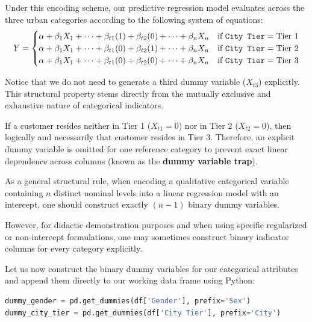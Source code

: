 Under this encoding scheme, our predictive regression model evaluates across the three urban categories according to the following system of equations:
\begin{align}
	Y =
	\begin{cases}
		\alpha + \beta_{1}X_{1} + \dots + \beta_{t1}(1) + \beta_{t2}(0) + \dots + \beta_{n}X_{n} & \text{if } \texttt{City Tier} = \text{Tier 1} \\
		\alpha + \beta_{1}X_{1} + \dots + \beta_{t1}(0) + \beta_{t2}(1) + \dots + \beta_{n}X_{n} & \text{if } \texttt{City Tier} = \text{Tier 2} \\
		\alpha + \beta_{1}X_{1} + \dots + \beta_{t1}(0) + \beta_{t2}(0) + \dots + \beta_{n}X_{n} & \text{if } \texttt{City Tier} = \text{Tier 3}
	\end{cases}
\end{align}

Notice that we do not need to generate a third dummy variable ($X_{t3}$) explicitly. This structural property stems directly from the mutually exclusive and exhaustive nature of categorical indicators.

If a customer resides neither in Tier 1 ($X_{t1}=0$) nor in Tier 2 ($X_{t2}=0$), then logically and necessarily that customer resides in Tier 3. Therefore, an explicit dummy variable is omitted for one reference category to prevent exact linear dependence across columns (known as the \textbf{dummy variable trap}).

\begin{observacion}
	As a general structural rule, when encoding a qualitative categorical variable containing $n$ distinct nominal levels into a linear regression model with an intercept, one should construct exactly $(n - 1)$ binary dummy variables.
\end{observacion}

However, for didactic demonstration purposes and when using specific regularized or non-intercept formulations, one may sometimes construct binary indicator columns for every category explicitly.

Let us now construct the binary dummy variables for our categorical attributes and append them directly to our working data frame using Python:

\begin{lstlisting}[language=Python]
dummy_gender = pd.get_dummies(df['Gender'], prefix='Sex')
dummy_city_tier = pd.get_dummies(df['City Tier'], prefix='City')
\end{lstlisting}

